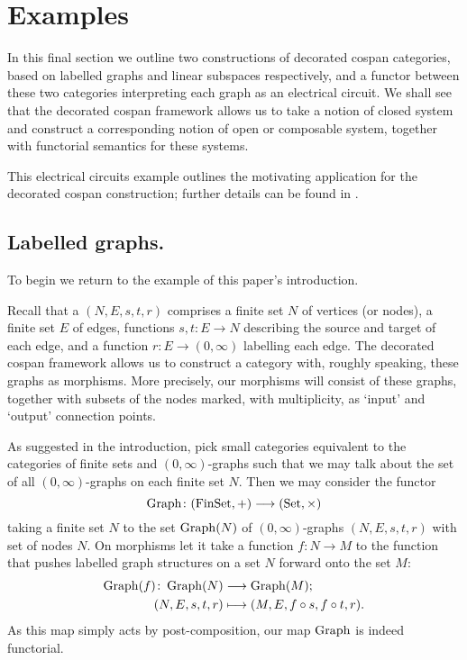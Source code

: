 \section{Examples} \label{sec:ex}

In this final section we outline two constructions of decorated cospan
categories, based on labelled graphs and linear subspaces respectively, and a
functor between these two categories interpreting each graph as an electrical
circuit. We shall see that the decorated cospan framework allows us to take a
notion of closed system and construct a corresponding notion of open or
composable system, together with functorial semantics for these systems.

This electrical circuits example outlines the motivating application for the
decorated cospan construction; further details can be found in \cite{BF}.

\subsection{Labelled graphs.}

To begin we return to the example of this paper's introduction. 

Recall that a  $(N,E,s,t,r)$ comprises a finite set
$N$ of vertices (or nodes), a finite set $E$ of edges, functions $s,t\colon  E \to N$
describing the source and target of each edge, and a function $r\colon  E \to
(0,\infty)$ labelling each edge. The decorated cospan framework allows us to
construct a category with, roughly speaking, these graphs as morphisms. More
precisely, our morphisms will consist of these graphs, together with subsets of
the nodes marked, with multiplicity, as `input' and `output' connection points.

As suggested in the introduction, pick small categories equivalent to the
categories of finite sets and $(0,\infty)$-graphs such that we may talk about
the set of all $(0,\infty)$-graphs on each finite set $N$.  Then we may consider
the functor
\[
  \operatorname{Graph}\colon  (\mathrm{FinSet},+) \longrightarrow (\mathrm{Set},\times)
\]
taking a finite set $N$ to the set $\operatorname{Graph}(N)$ of $(0,\infty)$-graphs
$(N,E,s,t,r)$ with set of nodes $N$. On
morphisms let it take a function $f\colon N \to M$ to the function that pushes
labelled graph structures on a set $N$ forward onto the set $M$:
\begin{align*}
  \operatorname{Graph}(f)\colon  \operatorname{Graph}(N) &\longrightarrow
  \operatorname{Graph}(M); \\
  (N,E,s,t,r) &\longmapsto (M,E,f \circ s, f \circ t, r).
\end{align*}
As this map simply acts by post-composition, our map $\operatorname{Graph}$ is indeed
functorial.

